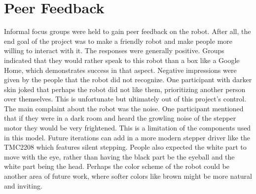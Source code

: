 \section{Peer Feedback}
Informal focus groups were held to gain peer feedback on the robot. After all, the end goal of the project was to make a friendly robot and make people more willing to interact with it. The responses were generally positive. Groups indicated that they would rather speak to this robot than a box like a Google Home, which demonstrates success in that aspect. Negative impressions were given by the people that the robot did not recognize. One participant with darker skin joked that perhaps the robot did not like them, prioritizing another person over themselves. This is unfortunate but ultimately out of this project's control. The main complaint about the robot was the noise. One participant mentioned that if they were in a dark room and heard the growling noise of the stepper motor they would be very frightened. This is a limitation of the components used in this model. Future iterations can add in a more modern stepper driver like the TMC2208 which features silent stepping. People also expected the white part to move with the eye, rather than having the black part be the eyeball and the white part being the head. Perhaps the color scheme of the robot could be another area of future work, where softer colors like brown might be more natural and inviting.